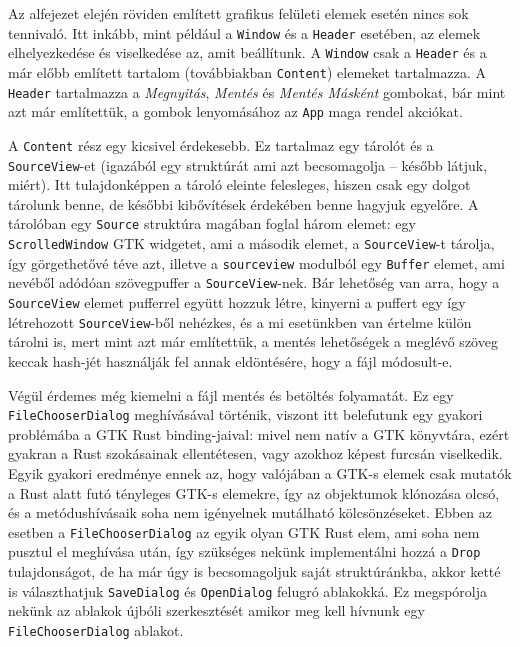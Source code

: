 Az alfejezet elején röviden említett grafikus felületi elemek esetén nincs sok tennivaló.
Itt inkább, mint például a \texttt{Window} és a \texttt{Header} esetében, az elemek elhelyezkedése és viselkedése az,
amit beállítunk.
A \texttt{Window} csak a \texttt{Header} és a már előbb említett tartalom (továbbiakban \texttt{Content})
elemeket tartalmazza.
A \texttt{Header} tartalmazza a \textit{Megnyitás}, \textit{Mentés} és \textit{Mentés Másként} gombokat,
bár mint azt már említettük, a gombok lenyomásához az \texttt{App} maga rendel akciókat.

A \texttt{Content} rész egy kicsivel érdekesebb.
Ez tartalmaz egy tárolót és a \texttt{SourceView}-et (igazából egy struktúrát ami azt becsomagolja -- 
később látjuk, miért).
Itt tulajdonképpen a tároló eleinte felesleges, hiszen csak egy dolgot tárolunk benne, de későbbi kibővítések
érdekében benne hagyjuk egyelőre.
A tárolóban egy \texttt{Source} struktúra magában foglal három elemet: egy \texttt{ScrolledWindow} GTK widgetet,
ami a második elemet, a \texttt{SourceView}-t tárolja, így görgethetővé téve azt, 
illetve a \texttt{sourceview} modulból egy \texttt{Buffer} elemet, ami nevéből adódóan szövegpuffer a \texttt{SourceView}-nek.
Bár lehetőség van arra, hogy a \texttt{SourceView} elemet pufferrel együtt hozzuk létre,
kinyerni a puffert egy így létrehozott \texttt{SourceView}-ből nehézkes,
és a mi esetünkben van értelme külön tárolni is, mert mint azt már említettük, a mentés lehetőségek
a meglévő szöveg keccak hash-jét használják fel annak eldöntésére, hogy a fájl módosult-e.

Végül érdemes még kiemelni a fájl mentés és betöltés folyamatát.
Ez egy \texttt{File\-Chooser\-Dialog} meghívásával történik, viszont itt belefutunk egy gyakori
problémába a GTK Rust binding-jaival: mivel nem natív a GTK könyvtára,
ezért gyakran a Rust szokásainak ellentétesen, vagy azokhoz képest furcsán viselkedik.
Egyik gyakori eredménye ennek az, hogy valójában a GTK-s elemek csak mutatók a Rust alatt futó
tényleges GTK-s elemekre\cite{glib:no_need_for_borrows}, így az objektumok klónozása olcsó,
és a metódushívásaik soha nem igényelnek mutálható kölcsönzéseket.
Ebben az esetben a \texttt{FileChooserDialog} az egyik olyan GTK Rust elem, ami soha nem pusztul el meghívása után,
így szükséges nekünk implementálni hozzá a \texttt{Drop} tulajdonságot, de ha már úgy is becsomagoljuk
saját struktúránkba, akkor ketté is választhatjuk \texttt{SaveDialog} és \texttt{OpenDialog} felugró ablakokká.
Ez megspórolja nekünk az ablakok újbóli szerkesztését amikor meg kell hívnunk egy \texttt{FileChooserDialog} ablakot.

